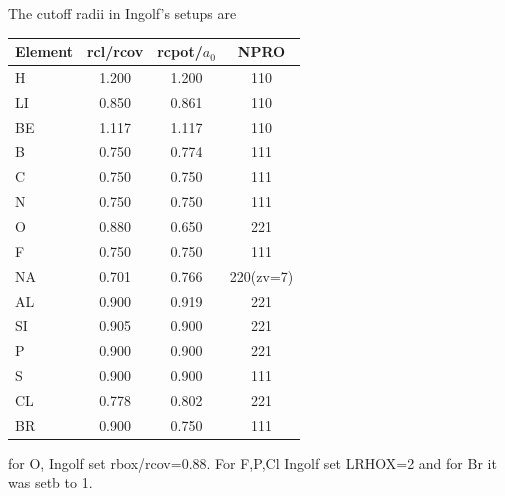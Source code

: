 \documentclass[11pt,a4paper]{report}
\begin{document}
The cutoff radii in Ingolf's setups are
\begin{center}
\begin{tabular}{|l|c|c|c|}
\hline
Element  & rcl/rcov & rcpot/$a_0$ & NPRO\\
\hline                            
H        &  1.200  &   1.200  &  110\\
LI       &  0.850  &   0.861  &  110\\
BE       &  1.117  &   1.117  &  110\\
B        &  0.750  &   0.774  &  111\\
C        &  0.750  &   0.750  &  111\\
N        &  0.750  &   0.750  &  111\\
O        &  0.880  &   0.650  &  221\\
F        &  0.750  &   0.750  &  111\\
NA       &  0.701  &   0.766  &  220(zv=7)\\
AL       &  0.900  &   0.919  &  221\\
SI       &  0.905  &   0.900  &  221\\
P        &  0.900  &   0.900  &  221\\
S        &  0.900  &   0.900  &  111\\
CL       &  0.778  &   0.802  &  221\\
BR       &  0.900  &   0.750  &  111\\
\hline
\end{tabular}
\end{center}
for O, Ingolf set rbox/rcov=0.88. For F,P,Cl Ingolf set LRHOX=2 and
for Br it was setb to 1.
\end{document}
